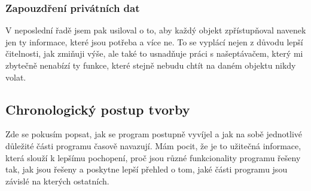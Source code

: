\documentclass[a4]{article}
\begin{document}
\subsubsection{Zapouzdření privátních dat}
V neposlední řadě jsem pak usiloval o to, aby každý objekt zpřístupňoval navenek jen ty informace, které jsou potřeba a více ne. To se vyplácí nejen z důvodu lepší čitelnosti, jak zmiňuji výše, ale také to usnadňuje práci s našeptávačem, který mi zbytečně nenabízí ty funkce, které stejně nebudu chtít na daném objektu nikdy volat.
\subsection{Chronologický postup tvorby}
Zde se pokusím popsat, jak se program postupně vyvíjel a jak na sobě jednotlivé důležité části programu časově navazují. Mám pocit, že je to užitečná informace, která slouží k lepšímu pochopení, proč jsou různé funkcionality programu řešeny tak, jak jsou řešeny a poskytne lepší přehled o tom, jaké části programu jsou závislé na kterých ostatních.
\end{document}

